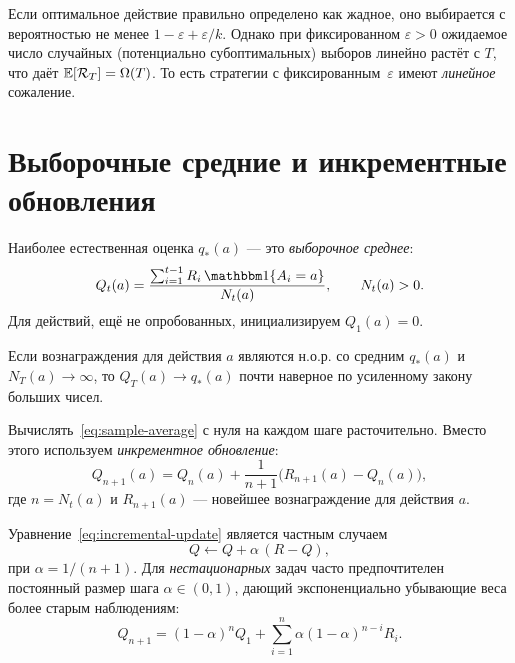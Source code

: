 \begin{remark}
\label{rem:eps-greedy-regret}
Если оптимальное действие правильно определено как жадное, оно выбирается с вероятностью не менее $1-\varepsilon+\varepsilon/k$.  Однако при фиксированном $\varepsilon>0$ ожидаемое число случайных (потенциально субоптимальных) выборов линейно растёт с $T$, что даёт $\operatorname{\mathbb{E}}[\mathcal{R}_T]=\Omega(T)$.  То есть стратегии с фиксированным~$\varepsilon$ имеют \emph{линейное} сожаление.
\end{remark}


\section{Выборочные средние и инкрементные обновления}
\label{sec:incremental}

Наиболее естественная оценка $q_*(a)$ — это \emph{выборочное среднее}:
\begin{equation}
\label{eq:sample-average}
Q_t(a) = \frac{\sum_{i=1}^{t-1}R_i\,\ind\{A_i=a\}}{N_t(a)}, \qquad N_t(a)>0.
\end{equation}
Для действий, ещё не опробованных, инициализируем $Q_1(a)=0$.

\begin{proposition}
Если вознаграждения для действия $a$ являются н.о.р. со средним $q_*(a)$ и $N_T(a)\to\infty$, то $Q_T(a)\to q_*(a)$ почти наверное по усиленному закону больших чисел.
\end{proposition}

Вычислять~\eqref{eq:sample-average} с нуля на каждом шаге расточительно.  Вместо этого используем \emph{инкрементное обновление}:
\begin{equation}
\label{eq:incremental-update}
Q_{n+1}(a) = Q_n(a) + \frac{1}{n+1}\bigl(R_{n+1}(a) - Q_n(a)\bigr),
\end{equation}
где $n=N_t(a)$ и $R_{n+1}(a)$ — новейшее вознаграждение для действия $a$.

\begin{remark}
\label{rem:general-update}
Уравнение~\eqref{eq:incremental-update} является частным случаем
\begin{equation}
\label{eq:general-update}
Q \leftarrow Q + \alpha\,(R - Q),
\end{equation}
при $\alpha=1/(n+1)$.  Для \emph{нестационарных} задач часто предпочтителен постоянный размер шага $\alpha\in(0,1)$, дающий экспоненциально убывающие веса более старым наблюдениям:
\[
Q_{n+1} = (1-\alpha)^n Q_1 + \sum_{i=1}^{n}\alpha(1-\alpha)^{n-i}R_i.
\]
\end{remark}

